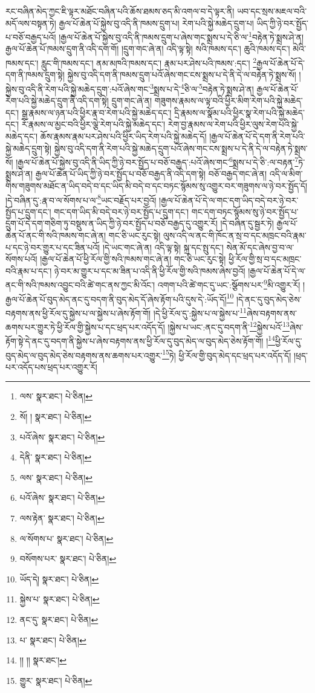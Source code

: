 རང་བཞིན་མེད་ཀྱང་ཇི་ལྟར་མཐོང་བཞིན་པའི་ཆོས་ཐམས་ཅད་མི་འགལ་བ་དེ་ལྟར་ནི། ཡབ་དང་སྲས་མཇལ་བའི་མདོ་ལས་བསྟན་ཏེ། རྒྱལ་པོ་ཆེན་པོ་སྐྱེས་བུ་འདི་ནི་ཁམས་དྲུག་པ། རེག་པའི་སྐྱེ་མཆེད་དྲུག་པ། ཡིད་ཀྱི་ཉེ་བར་སྤྱོད་པ་བཅོ་བརྒྱད་པའོ། །རྒྱལ་པོ་ཆེན་པོ་སྐྱེས་བུ་འདི་ནི་ཁམས་དྲུག་པ་ཞེས་གང་སྨྲས་པ་དེ་ཅི་ལ་\footnote{ལས་  སྣར་ཐང་།  པེ་ཅིན། }བརྟེན་ཏེ་སྨྲས་ཤེ་ན། རྒྱལ་པོ་ཆེན་པོ་ཁམས་དྲུག་ནི་འདི་དག་གོ། །དྲུག་གང་ཞེ་ན། འདི་ལྟ་སྟེ། སའི་ཁམས་དང་། ཆུའི་ཁམས་དང་། མེའི་ཁམས་དང་། རླུང་གི་ཁམས་དང་། ནམ་མཁའི་ཁམས་དང་། རྣམ་པར་ཤེས་པའི་ཁམས་:དང་། \footnote{སོ། །   སྣར་ཐང་།  པེ་ཅིན། }རྒྱལ་པོ་ཆེན་པོ་དེ་དག་ནི་ཁམས་དྲུག་སྟེ། སྐྱེས་བུ་འདི་དག་ནི་ཁམས་དྲུག་པའོ་ཞེས་གང་ངས་སྨྲས་པ་དེ་ནི་དེ་ལ་བརྟེན་ཏེ་སྨྲས་སོ། །སྐྱེས་བུ་འདི་ནི་རེག་པའི་སྐྱེ་མཆེད་དྲུག་:པའོ་ཞེས་གང་\footnote{པའོ་ཞེས་  སྣར་ཐང་།  པེ་ཅིན། }སྨྲས་པ་དེ་\footnote{དེནི་  སྣར་ཐང་།  པེ་ཅིན། }ཅི་ལ་\footnote{ལས་  སྣར་ཐང་།  པེ་ཅིན། }བརྟེན་ཏེ་སྨྲས་ཤེ་ན། རྒྱལ་པོ་ཆེན་པོ་རེག་པའི་སྐྱེ་མཆེད་དྲུག་ནི་འདི་དག་སྟེ། དྲུག་གང་ཞེ་ན། གཟུགས་རྣམས་ལ་ལྟ་བའི་ཕྱིར་མིག་རེག་པའི་སྐྱེ་མཆེད་དང་། སྒྲ་རྣམས་ལ་ཉན་པའི་ཕྱིར་རྣ་བ་རེག་པའི་སྐྱེ་མཆེད་དང་། དྲི་རྣམས་ལ་སྣོམ་པའི་ཕྱིར་སྣ་རེག་པའི་སྐྱེ་མཆེད་དང་། རོ་རྣམས་ལ་མྱང་བའི་ཕྱིར་ལྕེ་རེག་པའི་སྐྱེ་མཆེད་དང་། རེག་བྱ་རྣམས་ལ་རེག་པའི་ཕྱིར་ལུས་རེག་པའི་སྐྱེ་མཆེད་དང་། ཆོས་རྣམས་རྣམ་པར་ཤེས་པའི་ཕྱིར་ཡིད་རེག་པའི་སྐྱེ་མཆེད་དོ། །རྒྱལ་པོ་ཆེན་པོ་དེ་དག་ནི་རེག་པའི་སྐྱེ་མཆེད་དྲུག་སྟེ། སྐྱེས་བུ་འདི་དག་ནི་རེག་པའི་སྐྱེ་མཆེད་དྲུག་པའོ་ཞེས་གང་ངས་སྨྲས་པ་དེ་ནི་དེ་ལ་བརྟེན་ཏེ་སྨྲས་སོ། །རྒྱལ་པོ་ཆེན་པོ་སྐྱེས་བུ་འདི་ནི་ཡིད་ཀྱི་ཉེ་བར་སྤྱོད་པ་བཅོ་བརྒྱད་:པའོ་ཞེས་གང་\footnote{པའོ་ཞེས་  སྣར་ཐང་།  པེ་ཅིན། }སྨྲས་པ་དེ་ཅི་:ལ་བརྟན་\footnote{ལས་རྟེན་  སྣར་ཐང་།  པེ་ཅིན། }ཏེ་སྨྲས་ཤེ་ན། རྒྱལ་པོ་ཆེན་པོ་ཡིད་ཀྱི་ཉེ་བར་སྤྱོད་པ་བཅོ་བརྒྱད་ནི་འདི་དག་སྟེ། བཅོ་བརྒྱད་གང་ཞེ་ན། འདི་ལ་མིག་གིས་གཟུགས་མཐོང་ན་ཡིད་བདེ་བ་དང་ཡིད་མི་བདེ་བ་དང་བཏང་སྙོམས་སུ་འགྱུར་བར་གཟུགས་ལ་ཉེ་བར་སྤྱོད་དོ། །དེ་བཞིན་དུ་:རྣ་བ་ལ་སོགས་པ་ལ་\footnote{ལ་སོགས་པ་  སྣར་ཐང་།  པེ་ཅིན། }ཡང་བརྗོད་པར་བྱའོ། །རྒྱལ་པོ་ཆེན་པོ་དེ་ལ་གང་དག་ཡིད་བདེ་བར་ཉེ་བར་སྤྱོད་པ་དྲུག་དང་། གང་དག་ཡིད་མི་བདེ་བར་ཉེ་བར་སྤྱོད་པ་དྲུག་དང་། གང་དག་བཏང་སྙོམས་སུ་ཉེ་བར་སྤྱོད་པ་དྲུག་པོ་དེ་དག་གཅིག་ཏུ་བསྡུས་ན་ཡིད་ཀྱི་ཉེ་བར་སྤྱོད་པ་བཅོ་བརྒྱད་དུ་འགྱུར་རོ། །དེ་བཞིན་དུ་སྦྱར་ཏེ། རྒྱལ་པོ་ཆེན་པོ་ནང་གི་སའི་ཁམས་གང་ཞེ་ན། གང་ཅི་ཡང་རུང་སྟེ། ལུས་འདི་ལ་ནང་གི་ཁོང་ན་སྲ་བ་དང་མཁྲང་བའི་རྣམ་པ་དང་ཉེ་བར་གྱུར་པ་དང་ཟིན་པའོ། །དེ་ཡང་གང་ཞེ་ན། འདི་ལྟ་སྟེ། སྐྲ་དང་སྤུ་དང་། སེན་མོ་དང་ཞེས་བྱ་བ་ལ་སོགས་པའོ། །རྒྱལ་པོ་ཆེན་པོ་ཕྱི་རོལ་གྱི་སའི་ཁམས་གང་ཞེ་ན། གང་ཅི་ཡང་རུང་སྟེ། ཕྱི་རོལ་གྱི་སྲ་བ་དང་མཁྲང་བའི་རྣམ་པ་དང་། ཉེ་བར་མ་གྱུར་པ་དང་མ་ཟིན་པ་འདི་ནི་ཕྱི་རོལ་གྱི་སའི་ཁམས་ཞེས་བྱའོ། །རྒྱལ་པོ་ཆེན་པོ་དེ་ལ་ནང་གི་སའི་ཁམས་འབྱུང་བའི་ཚེ་གང་ནས་ཀྱང་མི་འོང་། འགག་པའི་ཚེ་གང་དུ་ཡང་:སྩོགས་པར་\footnote{བསོགས་པར་  སྣར་ཐང་།  པེ་ཅིན། }མི་འགྱུར་རོ། །རྒྱལ་པོ་ཆེན་པོ་བུད་མེད་ནང་དུ་བདག་ནི་བུད་མེད་དོ་ཞེས་རྟོག་པའི་དུས་དེ་:ཡོད་དོ།\footnote{ཡོད་དེ།  སྣར་ཐང་།  པེ་ཅིན། } །དེ་ནང་དུ་བུད་མེད་ཅེས་བརྟགས་ནས་ཕྱི་རོལ་དུ་སྐྱེས་པ་ལ་སྐྱེས་པ་ཞེས་རྟོག་གོ། །དེ་ཕྱི་རོལ་དུ་:སྐྱེས་པ་ལ་སྐྱེས་པ་\footnote{སྐྱེས་པ་  སྣར་ཐང་།  པེ་ཅིན། }ཞེས་བརྟགས་ནས་ཆགས་པར་གྱུར་ཏེ་ཕྱི་རོལ་གྱི་སྐྱེས་པ་དང་ཕྲད་པར་འདོད་དོ། །སྐྱེས་པ་ཡང་:ནང་དུ་བདག་ནི་\footnote{ནང་དུ་  སྣར་ཐང་།  པེ་ཅིན། }སྐྱེས་པའོ་\footnote{པ་  སྣར་ཐང་།  པེ་ཅིན། }ཞེས་རྟོག་སྟེ་དེ་ནང་དུ་བདག་ནི་སྐྱེས་པ་ཞེས་བརྟགས་ནས་ཕྱི་རོལ་དུ་བུད་མེད་ལ་བུད་མེད་ཅེས་རྟོག་གོ། །\footnote{།། །།  སྣར་ཐང་། }ཕྱི་རོལ་དུ་བུད་མེད་ལ་བུད་མེད་ཅེས་བརྟགས་ནས་ཆགས་པར་འགྱུར་\footnote{གྱུར་  སྣར་ཐང་།  པེ་ཅིན། }ཏེ། ཕྱི་རོལ་གྱི་བུད་མེད་དང་ཕྲད་པར་འདོད་དོ། །ཕྲད་པར་འདོད་པས་ཕྲད་པར་འགྱུར་རོ། 